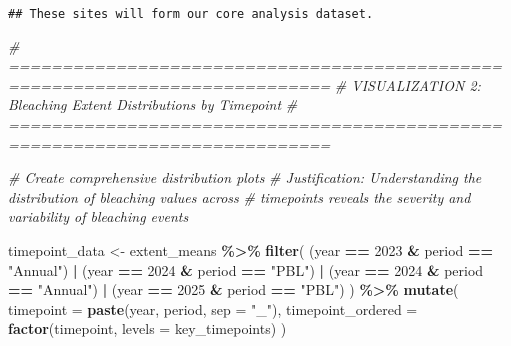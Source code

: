 \documentclass[
]{article}
\newenvironment{Shaded}{\begin{snugshade}}{\end{snugshade}}
\newcommand{\AttributeTok}[1]{\textcolor[rgb]{0.13,0.29,0.53}{#1}}
\newcommand{\CommentTok}[1]{\textcolor[rgb]{0.56,0.35,0.01}{\textit{#1}}}
\newcommand{\DecValTok}[1]{\textcolor[rgb]{0.00,0.00,0.81}{#1}}
\newcommand{\FunctionTok}[1]{\textcolor[rgb]{0.13,0.29,0.53}{\textbf{#1}}}
\newcommand{\NormalTok}[1]{#1}
\newcommand{\OtherTok}[1]{\textcolor[rgb]{0.56,0.35,0.01}{#1}}
\newcommand{\SpecialCharTok}[1]{\textcolor[rgb]{0.81,0.36,0.00}{\textbf{#1}}}
\newcommand{\StringTok}[1]{\textcolor[rgb]{0.31,0.60,0.02}{#1}}
\begin{document}
\begin{verbatim}
## These sites will form our core analysis dataset.
\end{verbatim}

\begin{Shaded}
\begin{Highlighting}[]
\CommentTok{\# ============================================================================}
\CommentTok{\# VISUALIZATION 2: Bleaching Extent Distributions by Timepoint}
\CommentTok{\# ============================================================================}

\CommentTok{\# Create comprehensive distribution plots}
\CommentTok{\# Justification: Understanding the distribution of bleaching values across}
\CommentTok{\# timepoints reveals the severity and variability of bleaching events}

\NormalTok{timepoint\_data }\OtherTok{\textless{}{-}}\NormalTok{ extent\_means }\SpecialCharTok{\%\textgreater{}\%}
  \FunctionTok{filter}\NormalTok{(}
\NormalTok{    (year }\SpecialCharTok{==} \DecValTok{2023} \SpecialCharTok{\&}\NormalTok{ period }\SpecialCharTok{==} \StringTok{"Annual"}\NormalTok{) }\SpecialCharTok{|}
\NormalTok{      (year }\SpecialCharTok{==} \DecValTok{2024} \SpecialCharTok{\&}\NormalTok{ period }\SpecialCharTok{==} \StringTok{"PBL"}\NormalTok{) }\SpecialCharTok{|}
\NormalTok{      (year }\SpecialCharTok{==} \DecValTok{2024} \SpecialCharTok{\&}\NormalTok{ period }\SpecialCharTok{==} \StringTok{"Annual"}\NormalTok{) }\SpecialCharTok{|}
\NormalTok{      (year }\SpecialCharTok{==} \DecValTok{2025} \SpecialCharTok{\&}\NormalTok{ period }\SpecialCharTok{==} \StringTok{"PBL"}\NormalTok{)}
\NormalTok{  ) }\SpecialCharTok{\%\textgreater{}\%}
  \FunctionTok{mutate}\NormalTok{(}
    \AttributeTok{timepoint =} \FunctionTok{paste}\NormalTok{(year, period, }\AttributeTok{sep =} \StringTok{"\_"}\NormalTok{),}
    \AttributeTok{timepoint\_ordered =} \FunctionTok{factor}\NormalTok{(timepoint, }\AttributeTok{levels =}\NormalTok{ key\_timepoints)}
\NormalTok{  )}


\end{Highlighting}
\end{Shaded}
\end{document}
